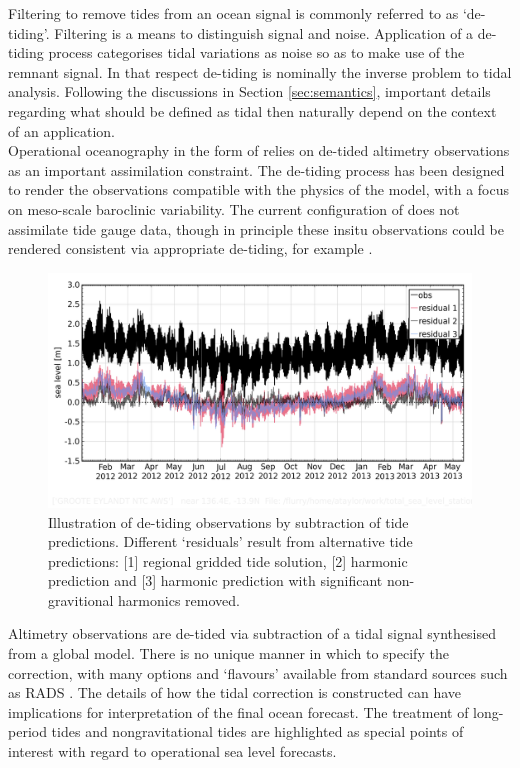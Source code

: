 Filtering to remove tides from an ocean signal is commonly referred to as `de-tiding'.  Filtering is a means to distinguish signal and noise.  Application of a de-tiding process categorises tidal variations as noise so as to make use of the remnant signal.   In that respect de-tiding is nominally the inverse problem to tidal analysis.   Following the discussions in Section \ref{sec:semantics}, important details regarding what should be defined as tidal then naturally depend on the context of an application.\\
Operational oceanography in the form of \BL{} relies on de-tided altimetry observations as an important assimilation constraint.   The de-tiding process has been designed to render the observations compatible with the physics of the model, with a focus on meso-scale baroclinic variability. The current configuration of \BL{} does not assimilate tide gauge data, though in principle these insitu observations could be rendered consistent via appropriate de-tiding, for example \cite{Matsumoto:2000tg}.
\begin{figure}[h]
\begin{center}
    \includegraphics[width=\figwidthFull]{figures/plots/diag_plot_014406_detide_compare_20120101.png}
    \caption{Illustration of de-tiding observations by subtraction of tide predictions.  Different `residuals' result from alternative tide predictions: [1] regional gridded tide solution, [2] harmonic prediction and [3] harmonic prediction with significant non-gravitional harmonics removed. }
    \end{center}
\end{figure}
Altimetry observations are de-tided via subtraction of a tidal signal synthesised from a global model.  There is no unique manner in which to specify the correction, with many options and `flavours' available from standard sources such as RADS \citep[table 3.2]{Scharroo:2011vd}.  The details of how the tidal correction is constructed can have implications for interpretation of the final ocean forecast.   The treatment of long-period tides \citep{Egbert:2003jd} and nongravitational tides \citep{Arbic:2005gv} are highlighted as special points of interest with regard to operational sea level forecasts.\\




